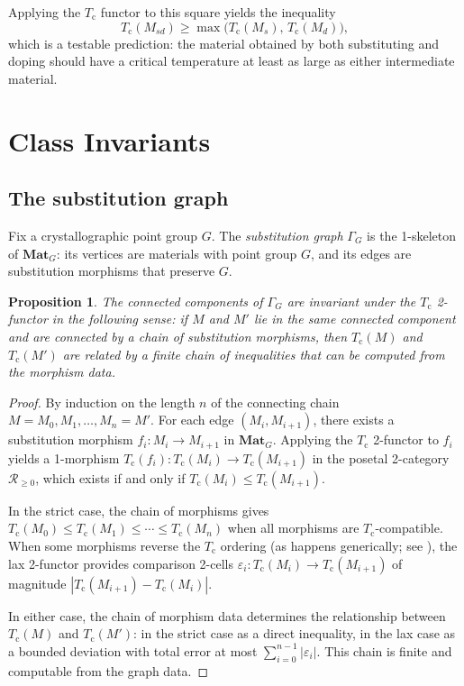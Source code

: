 \documentclass[12pt,a4paper]{article}
\theoremstyle{plain}
\newtheorem{proposition}[theorem]{Proposition}
\theoremstyle{definition}
\theoremstyle{remark}
\newcommand{\Tc}{T_{\mathrm{c}}}
\newcommand{\MatlG}{\mathbf{Mat}_G}
\begin{document}
\noindent
Applying the $\Tc$ functor to this square yields the inequality
\[
  \Tc(M_{sd}) \geq \max\bigl(\Tc(M_s),\, \Tc(M_d)\bigr),
\]
which is a testable prediction: the material obtained by both substituting
and doping should have a critical temperature at least as large as either
intermediate material.


\section{Class Invariants}\label{sec:class-inv}

\subsection{The substitution graph}

Fix a crystallographic point group $G$.  The \emph{substitution graph}
$\Gamma_G$ is the 1-skeleton of $\MatlG$: its vertices are materials with
point group $G$, and its edges are substitution morphisms that preserve $G$.

\begin{proposition}\label{prop:connected-components}
The connected components of $\Gamma_G$ are invariant under the $\Tc$
2-functor in the following sense: if $M$ and $M'$ lie in the same connected
component and are connected by a chain of substitution morphisms, then
$\Tc(M)$ and $\Tc(M')$ are related by a finite chain of inequalities that
can be computed from the morphism data.
\end{proposition}

\begin{proof}
By induction on the length $n$ of the connecting chain
$M = M_0, M_1, \ldots, M_n = M'$.  For each edge $(M_i, M_{i+1})$, there
exists a substitution morphism $f_i \colon M_i \to M_{i+1}$ in $\MatlG$.
Applying the $\Tc$ 2-functor to $f_i$ yields a 1-morphism
$\Tc(f_i) \colon \Tc(M_i) \to \Tc(M_{i+1})$ in the posetal 2-category
$\mathscr{R}_{\geq 0}$, which exists if and only if
$\Tc(M_i) \leq \Tc(M_{i+1})$.

In the strict case, the chain of morphisms gives
$\Tc(M_0) \leq \Tc(M_1) \leq \cdots \leq \Tc(M_n)$ when all morphisms
are $\Tc$-compatible.  When some morphisms reverse the $\Tc$ ordering
(as happens generically; see ), the lax
2-functor provides comparison 2-cells
$\varepsilon_i \colon \Tc(M_i) \to \Tc(M_{i+1})$ of magnitude
$|\Tc(M_{i+1}) - \Tc(M_i)|$.

In either case, the chain of morphism data determines the relationship
between $\Tc(M)$ and $\Tc(M')$: in the strict case as a direct inequality,
in the lax case as a bounded deviation with total error at most
$\sum_{i=0}^{n-1} |\varepsilon_i|$.  This chain is finite and computable
from the graph data.
\end{proof}
\end{document}
